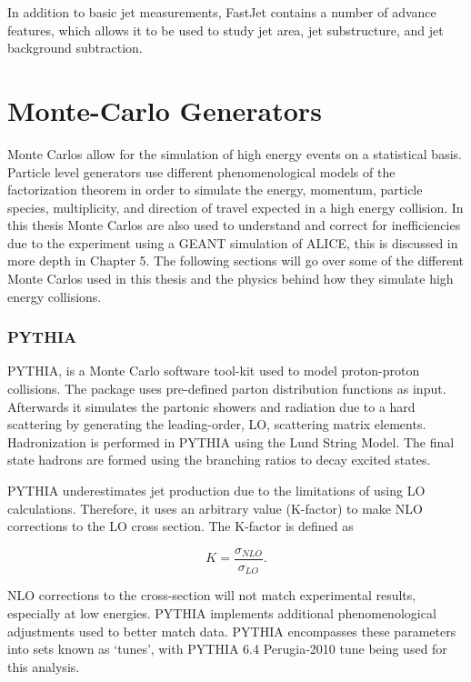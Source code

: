 \noindent
In addition to basic jet measurements, FastJet contains a number of advance features, which allows it to be used to study jet area, jet substructure, and jet background subtraction\cite{Connors:2017ptx}.

\section{Monte-Carlo Generators}
Monte Carlos allow for the simulation of high energy events on a statistical basis.  Particle level generators use different phenomenological models of the factorization theorem in order to simulate the energy, momentum, particle species, multiplicity, and direction of travel expected in a high energy collision.  In this thesis Monte Carlos are also used to understand and correct for inefficiencies due to the experiment using a GEANT simulation of ALICE, this is discussed in more depth in Chapter 5.  The following sections will go over some of the different Monte Carlos used in this thesis and the physics behind how they simulate high energy collisions.

\subsubsection{PYTHIA}

PYTHIA\cite{Sjostrand:2007gs}, is a Monte Carlo software tool-kit used to model proton-proton collisions.  The package uses pre-defined parton distribution functions as input.  Afterwards it simulates the partonic showers and radiation due to a hard scattering by generating the leading-order, LO, scattering matrix elements.  Hadronization is performed in PYTHIA using the Lund String Model.  The final state hadrons are formed using the branching ratios to decay excited states.

PYTHIA underestimates jet production due to the limitations of using LO calculations.  Therefore, it uses an arbitrary value (K-factor) to make NLO corrections to the LO cross section.  The K-factor is defined as

\begin{equation}
K = \frac{\sigma_{NLO}}{\sigma_{LO}}.
\label{eq:Kfactor}
\end{equation}

NLO corrections to the cross-section will not match experimental results, especially at low energies.  PYTHIA implements additional phenomenological adjustments used to better match data.  PYTHIA encompasses these parameters into sets known as `tunes', with PYTHIA 6.4 Perugia-2010 tune being used for this analysis\cite{Skands:2010ak}.

